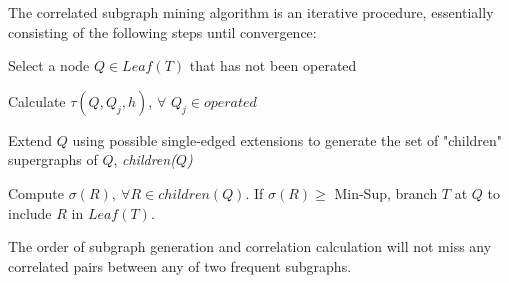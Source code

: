 
\par The correlated subgraph mining algorithm is an iterative procedure,
essentially consisting of the following steps until convergence:

 Select a node $Q\in Leaf(T)$ that has not
been operated

 Calculate $\tau(Q,Q_j,h)$, $\forall$
$Q_j\in \textit{operated}$

 Extend $Q$ using possible single-edged
extensions to generate the set of "children" supergraphs of $Q$, \textit{children($Q$)}

 Compute $\sigma(R),\ \forall R\in children(Q)$. If
$\sigma(R)\ge$ {\sf Min-Sup}, branch $T$ at $Q$ to include $R$ in $Leaf(T)$.

\begin{thrm}
	The order of subgraph generation and correlation calculation will not miss
	any correlated pairs between any of two frequent subgraphs.
\end{thrm}

